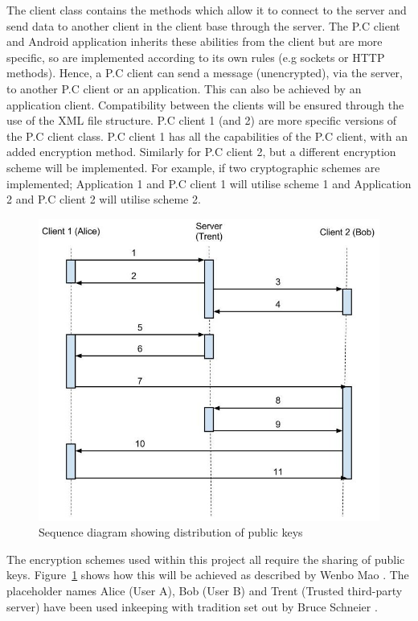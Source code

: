 \documentclass[a4paper,11pt]{article}
\begin{document}
The client class contains the methods which allow it to connect to the server and send data to another client in the client base through the server. The P.C client and Android application inherits these abilities from the client but are more specific, so are implemented according to its own rules (e.g sockets or HTTP methods). Hence, a P.C client can send a message (unencrypted), via the server, to another P.C client or an application. This can also be achieved by an application client. Compatibility between the clients will be ensured through the use of the XML file structure. P.C client 1 (and 2) are more specific versions of the P.C client class. P.C client 1 has all the capabilities of the P.C client, with an added encryption method. Similarly for P.C client 2, but a different encryption scheme will be implemented. For example, if two cryptographic schemes are implemented; Application 1 and P.C client 1 will utilise scheme 1 and Application 2 and P.C client 2 will utilise scheme 2. 

\begin{figure}[htb]
\centering
\includegraphics[scale=0.35]{designs3.jpg}
\caption{Sequence diagram showing distribution of public keys}
\label{fig:designs3}
\end{figure}

The encryption schemes used within this project all require the sharing of public keys. Figure~\ref{fig:designs3} shows how this will be achieved as described by Wenbo Mao \cite{wenbomao}. The placeholder names Alice (User A), Bob (User B) and Trent (Trusted third-party server) have been used inkeeping with tradition set out by Bruce Schneier \cite{bruceschneier}.
\end{document}
